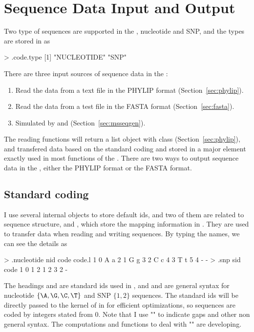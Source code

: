 \section[Sequence Data Input and Output]{Sequence Data Input and Output}
\label{sec:dataio}

Two type of sequences are supported in the ,
nucleotide and SNP, and the types are stored in  as
\begin{Code}
> .code.type
[1] "NUCLEOTIDE" "SNP" 
\end{Code}
There are three input sources of sequence data in the :
\begin{enumerate}
\item
Read the data from a text file in the PHYLIP format (Section~\ref{sec:phylip}).
\item
Read the data from a test file in the FASTA format (Section~\ref{sec:fasta}).
\item
Simulated by  and  (Section~\ref{sec:msseqgen}).
\end{enumerate}
The reading functions  will return a list object with
class {\color{red} } (Section~\ref{sec:phylip}),
and transfered data based on the standard coding and
stored in a major element {\color{red} }
exactly used in most functions of the .
There are two ways to output sequence data in the ,
either the PHYLIP format or the FASTA format.





\subsection[Standard coding]{Standard coding}
\label{sec:coding}

I use several internal objects to store default ids, and two of them
are related to sequence structure,  and ,
which store the mapping information in .
They are used to transfer data when reading and writing sequences.
By typing the names, we can see the details as
\begin{Code}
> .nucleotide
  nid code code.l
1   0    A      a
2   1    G      g
3   2    C      c
4   3    T      t
5   4    -      -
> .snp
  sid code
1   0    1
2   1    2
3   2    -
\end{Code}
The headings  and  are standard ids used in
, and  and  are general syntax 
for nucleotide $\{\A, \G, \C, \T\}$ and SNP $\{1, 2\}$ sequences.
The standard ids will be directly passed to the kernel of 
in  for efficient optimizations, so sequences are coded by
integers stated from 0.
Note that I use "\code{-}" to indicate gaps and other non general syntax.
The computations and functions to deal with "\code{-}" are developing.


